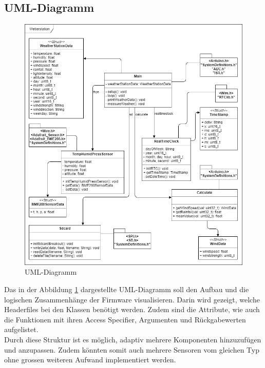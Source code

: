 \subsection{UML-Diagramm}
\label{subsec:uml}

\begin{figure}[hbtp]
\centering
\includegraphics[width=\textwidth]{graphics/UML/UML_Diagramm_picture.PNG}
\caption{UML-Diagramm}
\label{fig:uml_diagramm}
\end{figure}

Das in der Abbildung \ref{fig:uml_diagramm} dargestellte UML-Diagramm soll den Aufbau und die logischen Zusammenhänge der Firmware visualisieren. Darin wird gezeigt, welche Headerfiles bei den Klassen benötigt werden. Zudem sind die Attribute, wie auch die Funktionen mit ihren Access Specifier, Argumenten und Rückgabewerten aufgelistet. \\

Durch diese Struktur ist es möglich, adaptiv mehrere Komponenten hinzuzufügen und anzupassen. Zudem könnten somit auch mehrere Sensoren vom gleichen Typ ohne grossen weiteren Aufwand implementiert werden.\\

